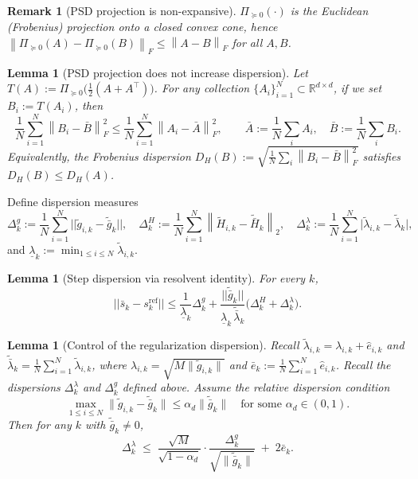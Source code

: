 \documentclass[11pt,a4paper]{article}
\def\norm#1{||#1||}%
\newtheorem{lemma}[theorem]{Lemma}
\newtheorem{remark}[theorem]{Remark}
\newcommand{\R}{\mathbb{R}}
\newcommand{\norm}[1]{\left\|#1\right\|}
\newcommand{\normtwo}[1]{\left\|#1\right\|_2}
\newcommand{\normF}[1]{\left\|#1\right\|_F}
\newcommand{\ProjPSD}{\Pi_{\succeq 0}}
\begin{document}
	\begin{remark}[PSD projection is non-expansive]\label{rem:psd-nonexp}
		$\ProjPSD(\cdot)$ is the Euclidean (Frobenius) projection onto a closed convex cone, hence
		$\normF{\ProjPSD(A)-\ProjPSD(B)}\le \normF{A-B}$ for all $A,B$.
	\end{remark}
	
	\begin{lemma}[PSD projection does not increase dispersion]\label{lem:psd-dispersion}
		Let $T(A):=\ProjPSD\bigl(\tfrac12(A+A^\top)\bigr)$. For any collection $\{A_i\}_{i=1}^N\subset\R^{d\times d}$,
		if we set $B_i:=T(A_i)$, then
		\[
		\frac1N\sum_{i=1}^N\normF{B_i-\bar B}^2
		\le \frac1N\sum_{i=1}^N\normF{A_i-\bar A}^2,
		\qquad\bar A:=\frac1N\sum_i A_i,\quad \bar B:=\frac1N\sum_i B_i.
		\]
		Equivalently, the Frobenius dispersion $D_H(B):=\sqrt{\frac1N\sum_i\normF{B_i-\bar B}^2}$ satisfies $D_H(B)\le D_H(A)$.
	\end{lemma}
	
	
	Define dispersion measures
	\[
	\Delta^g_k:=\frac1N\sum_{i=1}^N \norm{\tilde g_{i,k}-\tilde{\bar g}_k},\quad
	\Delta^H_k:=\frac1N\sum_{i=1}^N \normtwo{\tilde H_{i,k}-\tilde{\bar H}_k},\quad
	\Delta^\lambda_k:=\frac1N\sum_{i=1}^N \big|\tilde\lambda_{i,k}-\tilde{\bar\lambda}_k\big|,
	\]
	and $\underline\lambda_k:=\min_{1\le i\le N}\tilde\lambda_{i,k}$.
	
	\begin{lemma}[Step dispersion via resolvent identity]\label{lem:step-disp}
		For every $k$,
		\[
		\norm{\bar s_k-s^{\mathrm{ref}}_k}
		\le \frac{1}{\underline\lambda_k}\Delta^g_k
		+\frac{\norm{\tilde{\bar g}_k}}{\underline\lambda_k\,\tilde{\bar\lambda}_k}\big(\Delta^H_k+\Delta^\lambda_k\big).
		\]
	\end{lemma}
\begin{lemma}[Control of the regularization dispersion]\label{lem:delta_lambda_control}
	Recall $\tilde\lambda_{i,k}=\lambda_{i,k}+\hat e_{i,k}$ and
	$\tilde{\bar\lambda}_k=\frac1N\sum_{i=1}^N \tilde\lambda_{i,k}$, where
	$\lambda_{i,k}=\sqrt{M\|\tilde g_{i,k}\|}$ and $\bar e_k:=\frac1N\sum_{i=1}^N \hat e_{i,k}$.
Recall the dispersions $\Delta_k^\lambda$ and $\Delta_k^g$ defined above.
	Assume the relative dispersion condition
	\[
	\max_{1\le i\le N}\|\tilde g_{i,k}-\tilde{\bar g}_k\|\le \alpha_d\|\tilde{\bar g}_k\|
	\quad\text{for some }\alpha_d\in(0,1).
	\]
	Then for any $k$ with $\tilde{\bar g}_k\neq 0$,
	\begin{equation}\label{eq:delta_lambda_bound}
		\Delta_k^\lambda
		\;\le\;
		\frac{\sqrt{M}}{\sqrt{1-\alpha_d}}\cdot
		\frac{\Delta_k^g}{\sqrt{\|\tilde{\bar g}_k\|}}
		\;+\; 2\bar e_k.
	\end{equation}
\end{lemma}
\end{document}
